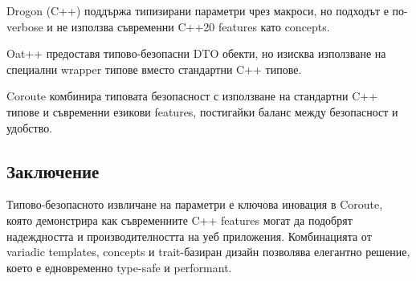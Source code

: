 Drogon (C++) поддържа типизирани параметри чрез макроси, но подходът е по-verbose и не използва съвременни C++20 features като concepts.

Oat++ предоставя типово-безопасни DTO обекти, но изисква използване на специални wrapper типове вместо стандартни C++ типове.

Coroute комбинира типовата безопасност с използване на стандартни C++ типове и съвременни езикови features, постигайки баланс между безопасност и удобство.

\subsection{Заключение}

Типово-безопасното извличане на параметри е ключова иновация в Coroute, която демонстрира как съвременните C++ features могат да подобрят надеждността и производителността на уеб приложения. Комбинацията от variadic templates, concepts и trait-базиран дизайн позволява елегантно решение, което е едновременно type-safe и performant.
